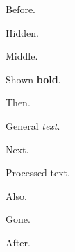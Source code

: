 \documentclass{article}
\begin{document}
Before.
\begin{noprint}
Hidden.
\end{noprint}
Middle.
\begin{doprint}
Shown \textbf{bold}.
\end{doprint}
Then.
\begin{gen}
General \emph{text}.
\end{gen}
Next.
\begin{proc}
Processed text.
\end{proc}
Also.
\begin{oldex}
Gone.
\end{oldex}

After.
\end{document}

